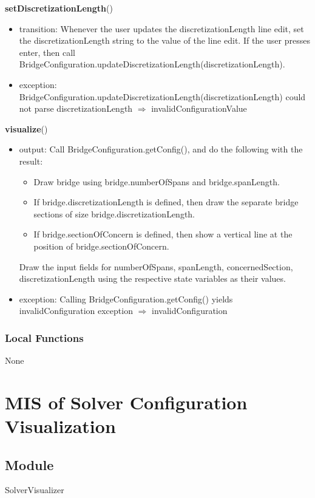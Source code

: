 \documentclass[12pt, titlepage]{article}
\begin{document}
\noindent \textbf{setDiscretizationLength}()
\begin{itemize}
\item transition: Whenever the user updates the discretizationLength line edit, set the discretizationLength string to the value of the line edit. If the user presses enter, then call BridgeConfiguration.updateDiscretizationLength(discretizationLength).
\item exception: BridgeConfiguration.updateDiscretizationLength(discretizationLength) could not parse discretizationLength $\Rightarrow$ invalidConfigurationValue
\end{itemize}

\noindent \textbf{visualize}()
\begin{itemize}
\item output: Call BridgeConfiguration.getConfig(), and do the following with the result:
\begin{itemize}
\item Draw bridge using bridge.numberOfSpans and bridge.spanLength.
\item If bridge.discretizationLength is defined, then draw the separate bridge sections of size bridge.discretizationLength.	
\item If bridge.sectionOfConcern is defined, then show a vertical line at the position of bridge.sectionOfConcern.
\end{itemize}
Draw the input fields for numberOfSpans, spanLength, concernedSection, discretizationLength using the respective state variables as their values.
\item exception: Calling BridgeConfiguration.getConfig() yields invalidConfiguration exception $\Rightarrow$ invalidConfiguration
\end{itemize}
\subsubsection{Local Functions}
None

\newpage
\section{MIS of Solver Configuration Visualization} \label{SolverVisualizer}

\subsection{Module}

SolverVisualizer
\end{document}
